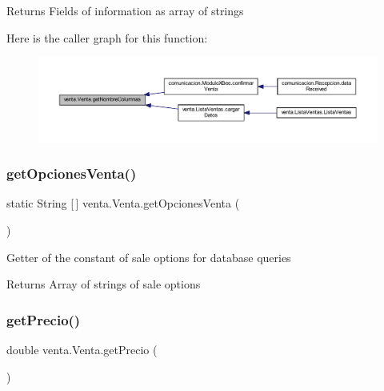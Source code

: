 \begin{DoxyReturn}{Returns}
Fields of information as array of strings 
\end{DoxyReturn}
Here is the caller graph for this function\+:
\nopagebreak
\begin{figure}[H]
\begin{center}
\leavevmode
\includegraphics[width=350pt]{classventa_1_1_venta_a517a4e2b36e633e0adab951596a733ed_icgraph}
\end{center}
\end{figure}
\mbox{\label{classventa_1_1_venta_a9e1fb21792aa11bcf6e5d85e4bc4444d}} 
\subsubsection{\texorpdfstring{get\+Opciones\+Venta()}{getOpcionesVenta()}}
{\footnotesize\ttfamily static String \mbox{[}$\,$\mbox{]} venta.\+Venta.\+get\+Opciones\+Venta (\begin{DoxyParamCaption}{ }\end{DoxyParamCaption})\hspace{0.3cm}{\ttfamily [static]}}

Getter of the constant of sale options for database queries

\begin{DoxyReturn}{Returns}
Array of strings of sale options 
\end{DoxyReturn}
\mbox{\label{classventa_1_1_venta_a439c68a9611863ddf15f3e3d5ee4fb79}} 
\subsubsection{\texorpdfstring{get\+Precio()}{getPrecio()}}
{\footnotesize\ttfamily double venta.\+Venta.\+get\+Precio (\begin{DoxyParamCaption}{ }\end{DoxyParamCaption})}

